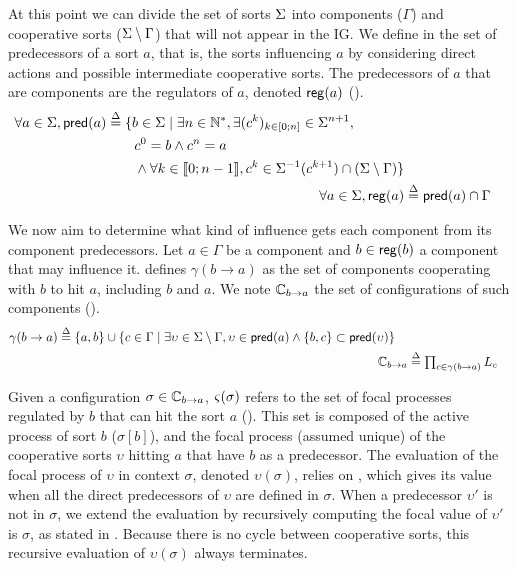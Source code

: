 At this point we can divide the set of sorts $\Sigma$ into components ($\Gamma$) and cooperative sorts
($\Sigma \setminus \Gamma$) that will not appear in the IG. 
We define in  the set of predecessors of a sort $a$, that is, the sorts influencing $a$
by considering direct actions and possible intermediate cooperative sorts.
The predecessors of $a$ that are components are the regulators of $a$, denoted $\mathsf{reg}({a})$
().
\begin{align}
\begin{split}
\forall a \in \Sigma, \mathsf{pred}(a) &\stackrel{\Delta}= \{b \in \Sigma \mid \exists n \in \mathbb{N}^*, \exists
(c^k)_{k \in [0;n]} \in \Sigma^{n+1}, \\
                                   & \quad \quad c^0 = b \wedge c^n = a \\
                                   & \quad \quad \wedge \forall k \in \llbracket 0 ; n-1 \rrbracket,
								   c^k \in \Sigma^{-1}(c^{k+1}) \cap (\Sigma\setminus\Gamma)\}
\end{split}
\label{eq:ph_predec}
\\
\forall a\in \Sigma, \mathsf{reg}({a}) & \stackrel{\Delta}= \mathsf{pred}(a) \cap \Gamma
\label{eq:regulators}
\end{align}

We now aim to determine what kind of influence gets each component from its component predecessors.
Let $a \in \Gamma$ be a component and $b \in \mathsf{reg}({b})$ a component that may influence it.
 defines 
$\gamma(b\rightarrow a)$ as the set of components cooperating with $b$ to hit $a$, including $b$ and
$a$.
We note $\mathbb C_{b\rightarrow a}$ the set of configurations of such components ().
\begin{align}
\begin{split}
\gamma(b\rightarrow a)  &\stackrel{\Delta}= \{ a, b \} \cup \{ c \in \Gamma \mid 
			\exists \upsilon\in\Sigma\setminus\Gamma,
				\upsilon\in\mathsf{pred}(a) \wedge \{b,c\}\subset\mathsf{pred}(\upsilon) \}
\end{split}
\label{eq:cooperating-with-b}
\\
\mathbb C_{b\rightarrow a} & \stackrel{\Delta}= \textstyle\prod_{c\in\gamma(b\rightarrow a)} L_c
\label{eq:configurations}
\end{align}

Given a configuration $\sigma\in\mathbb C_{b\rightarrow a}$, $\varsigma(\sigma)$ refers to the set of focal processes
regulated by $b$ that can hit the sort $a$ ().
This set is composed of the active process of sort $b$ ($\sigma[b]$), and the focal process (assumed
unique) of the cooperative sorts $\upsilon$ hitting $a$ that have $b$ as a predecessor.
The evaluation of the focal process of $\upsilon$ in context $\sigma$, denoted $\upsilon(\sigma)$,
relies on , which gives its value when all the direct predecessors of
$\upsilon$ are defined in $\sigma$.
When a predecessor $\upsilon'$ is not in $\sigma$, we extend the evaluation by recursively computing
the focal value of $\upsilon'$ is $\sigma$, as stated in .
Because there is no cycle between cooperative sorts, this recursive evaluation of $\upsilon(\sigma)$
always terminates.

